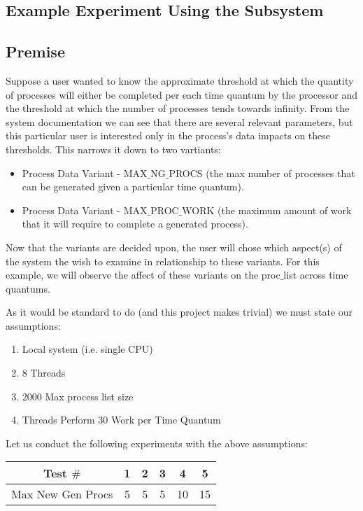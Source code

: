 \documentclass[acmsmall]{acmart}
\begin{document}
\begin{multicols}{2}
\section{Example Experiment Using the Subsystem}
  \subsection{Premise}
    Suppose a user wanted to know the approximate threshold at which the
    quantity of processes will either be completed per each time quantum by the
    processor and the threshold at which the number of processes tends towards
    infinity. From the system documentation we can see that there are several
    relevant parameters, but this particular user is interested only in the
    process's data impacts on these thresholds.  This narrows it down to two
    vartiants:
    \begin{itemize}
      \item Process Data Variant - MAX$\_$NG$\_$PROCS (the max number of
        processes that can be generated given a particular time quantum).
      \item Process Data Variant - MAX$\_$PROC$\_$WORK (the maximum amount of
        work that it will require to complete a generated process).
    \end{itemize}
    Now that the variants are decided upon, the user will chose which aspect(s)
    of the system the wish to examine in relationship to these variants. For
    this example, we will observe the affect of these variants on the
    proc$\_$list across time quantums.
    \par
    As it would be standard to do (and this project makes trivial) we must state
    our assumptions:
    \begin{enumerate}
      \item Local system (i.e. single CPU)
      \item 8 Threads
      \item 2000 Max process list size
      \item Threads Perform 30 Work per Time Quantum
    \end{enumerate}
    Let us conduct the following experiments with the above assumptions:
    \par
    \begin{tabular}{|c|ccccc|}
      \hline
      Test $\#$         & 1  & 2  & 3  & 4  & 5 \\
      \hline
      Max New Gen Procs & 5  & 5  & 5  & 10 & 15 \\

\end{tabular}
\end{multicols}
\end{document}
